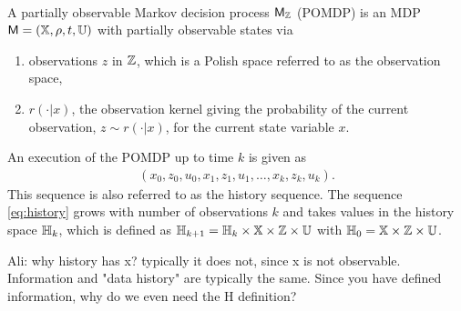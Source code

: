 \documentclass{ifacconf}
\renewcommand{\axx}[1]{{\color{orange} Ali: #1}}
\newcommand{\cristi}[1]{{\color{orange}#1}}
\begin{document}
\begin{definition} \label{def:MDP}\mbox{ }\\
A partially observable Markov decision process $\mathsf{M}_{{\mathbb{Z}}}$ (POMDP) is an MDP $\mathsf{M} = ({\mathbb{X}}, \rho, t, {\mathbb{U}})$
\cristi{with partially observable states} via
\begin{enumerate}
	\item observations $z$ in ${\mathbb{Z}}$,  which is a Polish space %
	referred to as the observation space, %
\item $r(\cdot|x)$,  the observation kernel giving the probability of the current observation,  $z\sim r(\cdot|x)$,  for the current state variable $x$.
\end{enumerate}


\end{definition} 

An execution of the POMDP  up to time $k$ is given as
\begin{align}\label{eq:history} (x_0,z_0,u_0,x_1,z_1,u_1,\ldots,x_k,z_k,u_k).\end{align}
This sequence is also referred to as the history sequence.
The sequence  \eqref{eq:history} grows with number of observations  $k$ and takes values in the history space ${\mathbb{H}}_k$, which is defined as
  ${\mathbb{H}}_{k+1}={\mathbb{H}}_{k}\times{\mathbb{X}}\times{\mathbb{Z}}\times {\mathbb{U}}$ with ${\mathbb{H}}_0={\mathbb{X}}\times{\mathbb{Z}}\times {\mathbb{U}}$.
  
  \axx{why history has x? typically it does not, since x is not observable. Information and "data history" are typically the same. Since you have defined information, why do we even need the H definition?}
  
\end{document}
